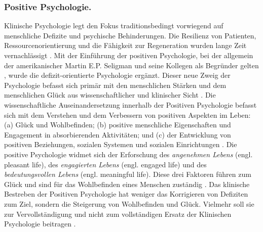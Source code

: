 \subsubsection{Positive Psychologie.} 
Klinische Psychologie legt den Fokus traditionsbedingt vorwiegend auf menschliche Defizite und psychische Behinderungen. Die Resilienz von Patienten, Ressourcenorientierung und die Fähigkeit zur Regeneration wurden lange Zeit vernachlässigt \cite{Carr2011}. Mit der Einführung der positiven Psychologie, bei der allgemein der amerikanischer Martin E.P. Seligman und seine Kollegen als Begründer gelten \cite{Seligman2003}, wurde die defizit-orientierte Psychologie ergänzt. Dieser neue Zweig der Psychologie befasst sich primär mit den menschlichen Stärken und dem menschlichen Glück aus wissenschaftlicher und klinischer Sicht \cite{Carr2011}. Die wissenschaftliche Auseinandersetzung innerhalb der Positiven Psychologie befasst sich mit dem Verstehen und dem Verbessern von positiven Aspekten im Leben: (a) Glück und Wohlbefinden; (b) positive menschliche Eigenschaften und Engagement in absorbierenden Aktivitäten; und (c) der Entwicklung von positiven Beziehungen, sozialen Systemen und sozialen Einrichtungen \cite{Lopez2009, Seligman2003}. Die positive Psychologie widmet sich der Erforschung des \textit{angenehmen Lebens} (engl. pleasant life), des \textit{engagierten Lebens} (engl. engaged life) und des \textit{bedeutungsvollen Lebens} (engl. meaningful life). Diese drei Faktoren führen zum Glück und sind für das Wohlbefinden eines Menschen zuständig \cite{Peterson2005}. Das klinische Bestreben der Positiven Psychologie hat weniger das Korrigieren von Defiziten zum Ziel, sondern die Steigerung von Wohlbefinden und Glück. Vielmehr soll sie zur Vervollständigung und nicht zum vollständigen Ersatz der Klinischen Psychologie beitragen \cite{Carr2011}.

